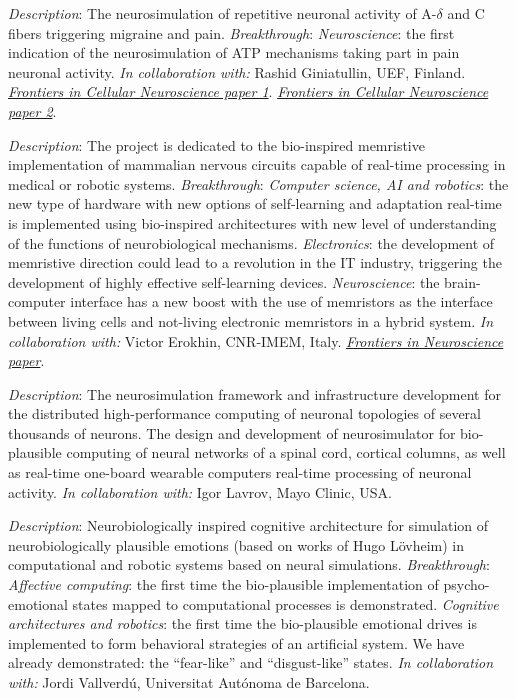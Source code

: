 \documentclass{moderncv}
\begin{document}
    {\small \emph{Description}: The neurosimulation of repetitive neuronal activity of A-$\delta$ and C fibers triggering migraine and pain. \newline{}
    \emph{Breakthrough}:
    \emph{Neuroscience}: the first indication of the neurosimulation of ATP mechanisms taking part in pain neuronal activity.
    \emph{In collaboration with:} Rashid Giniatullin, UEF, Finland.
    \href{https://www.frontiersin.org/articles/10.3389/fncel.2020.00135/full}{\emph{Frontiers in Cellular Neuroscience paper 1}}.
    \href{https://www.frontiersin.org/articles/10.3389/fncel.2021.644047/full}{\emph{Frontiers in Cellular Neuroscience paper 2}}.
    }

    {\small \emph{Description}: The project is dedicated to the bio-inspired memristive implementation of mammalian nervous circuits capable of real-time processing in medical or robotic systems. \newline{}
    \emph{Breakthrough}:
    \emph{Computer science, AI and robotics}: the new type of hardware with new options of self-learning and adaptation real-time is implemented using bio-inspired architectures with new level of understanding of the functions of neurobiological mechanisms.
    \emph{Electronics}: the development of memristive direction could lead to a revolution in the IT industry, triggering the development of highly effective self-learning devices.
    \emph{Neuroscience}: the brain-computer interface has a new boost with the use of memristors as the interface between living cells and not-living electronic memristors in a hybrid system.
    \emph{In collaboration with:} Victor Erokhin, CNR-IMEM, Italy.
    \href{https://www.frontiersin.org/articles/10.3389/fnins.2020.00358/full}{\emph{Frontiers in Neuroscience paper}}.}

    {\small \emph{Description}: The neurosimulation framework and infrastructure development for the distributed high-performance computing of neuronal topologies of several thousands of neurons.
    The design and development of neurosimulator for bio-plausible computing of neural networks of a spinal cord, cortical columns, as well as real-time one-board wearable computers real-time processing of neuronal activity.
    \emph{In collaboration with:} Igor Lavrov, Mayo Clinic, USA.}

    {\small \emph{Description}: Neurobiologically inspired cognitive architecture for simulation of neurobiologically plausible emotions (based on works of Hugo L\"{o}vheim) in computational and robotic systems based on neural simulations.
    \emph{Breakthrough}: \emph{Affective computing}: the first time the bio-plausible implementation of psycho-emotional states mapped to computational processes is demonstrated. \emph{Cognitive architectures and robotics}: the first time the bio-plausible emotional drives is implemented to form behavioral strategies of an artificial system. We have already demonstrated: the ``fear-like'' and ``disgust-like'' states.
    \emph{In collaboration with:} Jordi Vallverd\'u, Universitat Aut\'onoma de Barcelona.}
\end{document}
